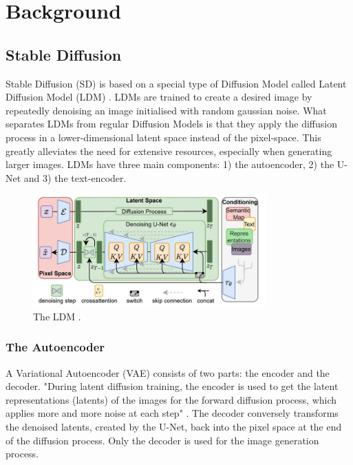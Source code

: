 \section{Background}



\subsection{Stable Diffusion}
Stable Diffusion (SD) is based on a special type of Diffusion Model called Latent Diffusion Model (LDM) \cite{Rombach_2022_CVPR}. LDMs are trained to create a desired image by repeatedly denoising an image initialised with random gaussian noise. What separates LDMs from regular Diffusion Models is that they apply the diffusion process in a lower-dimensional latent space instead of the pixel-space. This greatly alleviates the need for extensive resources, especially when generating larger images. LDMs have three main components: 1) the autoencoder, 2) the U-Net and 3) the text-encoder.
\begin{figure}[!htb]
\centering
\includegraphics[width=0.8\textwidth]
{static/LDM.png}
\caption{The LDM \cite[Fig.~3]{Rombach_2022_CVPR}.}
\label{fig:ldm}
\end{figure}



\subsubsection{The Autoencoder}
A Variational Autoencoder (VAE) consists of two parts: the encoder and the decoder. "During latent diffusion training, the encoder is used to get the latent representations (latents) of the images for the forward diffusion process, which applies more and more noise at each step" \cite{patil2022stable}. The decoder conversely transforms the denoised latents, created by the U-Net, back into the pixel space at the end of the diffusion process. Only the decoder is used for the image generation process.



